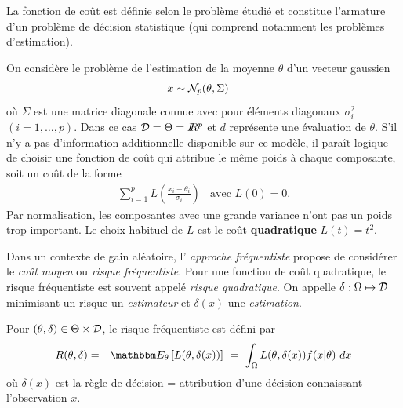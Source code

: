La fonction de coût est définie selon le problème étudié et constitue l'armature d'un problème de décision statistique (qui comprend notamment les problèmes d'estimation). \\

\begin{exo}
On considère le problème de l'estimation de la moyenne $\theta$ d'un vecteur gaussien
\begin{eqnarray*}
x & \sim {\cal{N}}_p(\theta,\Sigma)
\end{eqnarray*}
où $\Sigma$ est une matrice diagonale connue avec pour éléments diagonaux $\sigma^2_i$ $(i=1,\ldots,p)$. Dans ce cas ${\cal{D}}=\Theta=I\!\!R^p$ et $d$ représente une évaluation de $\theta$. S'il n'y a pas d'information additionnelle disponible sur ce modèle, il para\^it logique de choisir une fonction de co\^ut qui attribue le m\^eme poids à chaque composante, soit un co\^ut de la forme
\begin{eqnarray*}
\sum\limits_{i=1}^p L\left(\frac{x_i - \theta_i}{\sigma_i}\right) \ \ \ \ \text{avec $L(0)=0$}.
\end{eqnarray*}
Par normalisation, les composantes avec une grande variance n'ont pas un poids trop important. Le choix habituel de $L$ est le co\^ut {\bf quadratique} $L(t)=t^2$. \\
\end{exo}

Dans un contexte de gain aléatoire, l' \emph{approche fréquentiste} propose de considérer le  \emph{co\^ut moyen} ou  { \emph{ risque fréquentiste}}. Pour une fonction de coût quadratique, le risque fréquentiste est souvent appelé \emph{risque quadratique}. On appelle  \emph{$\delta:\Omega \mapsto {\cal{D}}$} minimisant un risque un  \emph{ \emph{estimateur}} et  \emph{$\delta(x)$}  une  \emph{ \emph{estimation}}.


\begin{definition}
Pour $(\theta,\delta)\in\Theta\times{\cal{D}}$, le risque fréquentiste est défini par
\begin{eqnarray*}
{R(\theta,\delta)} & = &  {\E_{\theta}\left[L(\theta,\delta(x))\right] \ = \ \int_{\Omega} L(\theta,\delta(x)) f(x|\theta) \ dx}
\end{eqnarray*}
où $\delta(x)$ est la règle de décision  = attribution d'une décision connaissant l'observation $x$.
\end{definition}




